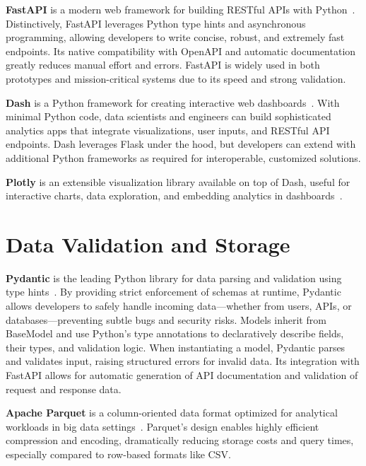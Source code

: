\textbf{FastAPI} is a modern web framework for building RESTful APIs with Python~\cite{fastapi2025}.
Distinctively, FastAPI leverages Python type hints and asynchronous programming, allowing developers to write concise, robust, and extremely fast endpoints.
Its native compatibility with OpenAPI and automatic documentation greatly reduces manual effort and errors.
FastAPI is widely used in both prototypes and mission-critical systems due to its speed and strong validation.

\textbf{Dash} is a Python framework for creating interactive web dashboards~\cite{dash2025}.
With minimal Python code, data scientists and engineers can build sophisticated analytics apps that integrate visualizations, user inputs, and RESTful API endpoints.
Dash leverages Flask under the hood, but developers can extend with additional Python frameworks as required for interoperable, customized solutions.

\textbf{Plotly} is an extensible visualization library available on top of Dash, useful for interactive charts, data exploration, and embedding analytics in dashboards~\cite{plotly2025}.

\section{Data Validation and Storage}

\textbf{Pydantic} is the leading Python library for data parsing and validation using type hints~\cite{pydantic2025}.
By providing strict enforcement of schemas at runtime, Pydantic allows developers to safely handle incoming data—whether from users, APIs, or databases—preventing subtle bugs and security risks.
Models inherit from BaseModel and use Python's type annotations to declaratively describe fields, their types, and validation logic.
When instantiating a model, Pydantic parses and validates input, raising structured errors for invalid data.
Its integration with FastAPI allows for automatic generation of API documentation and validation of request and response data.

\textbf{Apache Parquet} is a column-oriented data format optimized for analytical workloads in big data settings~\cite{vohra2016parquet}.
Parquet's design enables highly efficient compression and encoding, dramatically reducing storage costs and query times, especially compared to row-based formats like CSV.
